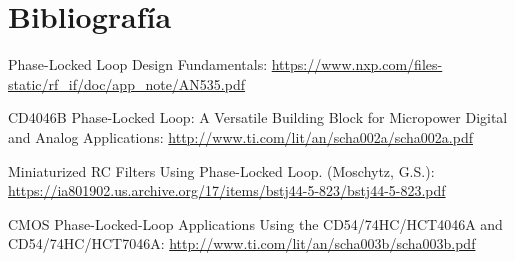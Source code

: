 \section{Bibliografía}
Phase-Locked Loop Design Fundamentals: \url{https://www.nxp.com/files-static/rf_if/doc/app_note/AN535.pdf}

CD4046B Phase-Locked Loop: A Versatile Building
Block for Micropower Digital and Analog Applications: \url{http://www.ti.com/lit/an/scha002a/scha002a.pdf}

Miniaturized RC Filters Using Phase-Locked Loop. (Moschytz, G.S.): \url{https://ia801902.us.archive.org/17/items/bstj44-5-823/bstj44-5-823.pdf}

CMOS Phase-Locked-Loop Applications Using the
CD54/74HC/HCT4046A and CD54/74HC/HCT7046A: \url{http://www.ti.com/lit/an/scha003b/scha003b.pdf}



